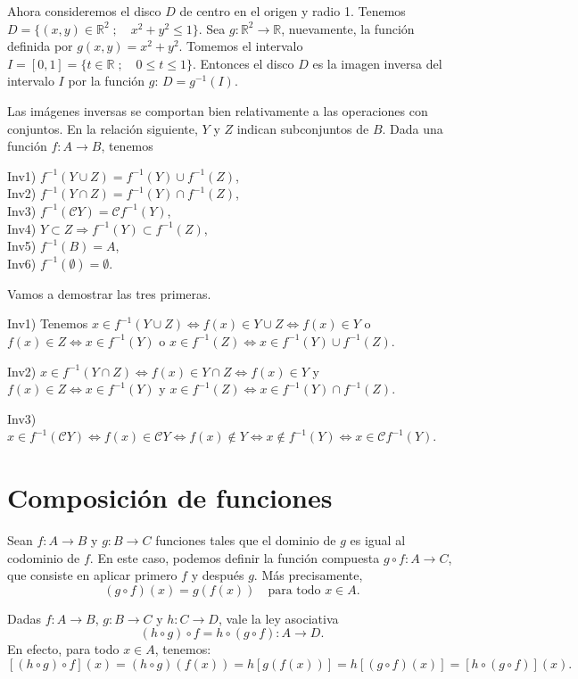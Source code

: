 \documentclass[12pt,oneside]{book}
\begin{document}
Ahora consideremos el disco \(D\) de centro en el origen y radio 1. Tenemos \(D = \{(x, y) \in \mathbb{R}^2 \; ; \quad x^2 + y^2 \leq 1\}\). Sea \(g: \mathbb{R}^2 \to \mathbb{R}\), nuevamente, la función definida por \(g(x, y) = x^2 + y^2\). Tomemos el intervalo \(I = [0, 1] = \{t \in \mathbb{R} \; ; \quad 0 \leq t \leq 1\}\). Entonces el disco \(D\) es la imagen inversa del intervalo \(I\) por la función \(g\): \(D = g^{-1}(I)\).

Las imágenes inversas se comportan bien relativamente a las operaciones con conjuntos. En la relación siguiente, \(Y\) y \(Z\) indican subconjuntos de \(B\). Dada una función \(f: A \to B\), tenemos

Inv1) \(f^{-1}(Y \cup Z) = f^{-1}(Y) \cup f^{-1}(Z)\),\\
Inv2) \(f^{-1}(Y \cap Z) = f^{-1}(Y) \cap f^{-1}(Z)\),\\
Inv3) \(f^{-1}(\mathcal{C}Y) = \mathcal{C} f^{-1}(Y)\),\\
Inv4) \(Y \subset Z \Rightarrow f^{-1}(Y) \subset f^{-1}(Z)\),\\
Inv5) \(f^{-1}(B) = A\),\\
Inv6) \(f^{-1}(\emptyset) = \emptyset\).

Vamos a demostrar las tres primeras.

Inv1) Tenemos \(x \in f^{-1}(Y \cup Z) \iff f(x) \in Y \cup Z \iff f(x) \in Y\) o \(f(x) \in Z \iff x \in f^{-1}(Y)\) o \(x \in f^{-1}(Z) \iff x \in f^{-1}(Y) \cup f^{-1}(Z)\).

Inv2) \(x \in f^{-1}(Y \cap Z) \iff f(x) \in Y \cap Z \iff f(x) \in Y\) y \(f(x) \in Z \iff x \in f^{-1}(Y)\) y \(x \in f^{-1}(Z) \iff x \in f^{-1}(Y) \cap f^{-1}(Z)\).

Inv3) \(x \in f^{-1}(\mathcal{C}Y) \iff f(x) \in \mathcal{C}Y \iff f(x) \notin Y \iff x \notin f^{-1}(Y) \iff x \in \mathcal{C} f^{-1}(Y)\).

\section{Composición de funciones}

Sean \(f: A \to B\) y \(g: B \to C\) funciones tales que el dominio de \(g\) es igual al codominio de \(f\). En este caso, podemos definir la función compuesta \(g \circ f: A \to C\), que consiste en aplicar primero \(f\) y después \(g\). Más precisamente,
\[
(g \circ f)(x) = g(f(x)) \quad \text{para todo } x \in A.
\]

Dadas \(f: A \to B\), \(g: B \to C\) y \(h: C \to D\), vale la ley asociativa
\[
(h \circ g) \circ f = h \circ (g \circ f): A \to D.
\]
En efecto, para todo \(x \in A\), tenemos:
\[
[(h \circ g) \circ f](x) = (h \circ g)(f(x)) = h[g(f(x))] = h[(g \circ f)(x)] = [h \circ (g \circ f)](x).
\]
\end{document}
